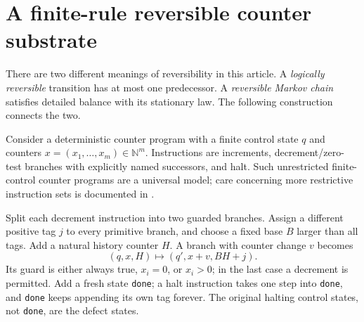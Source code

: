 \documentclass[11pt,letterpaper]{article}
\numberwithin{equation}{section}
\theoremstyle{definition}
\theoremstyle{remark}
\newcommand{\N}{\mathbb N}
\newcommand{\code}[1]{\nolinkurl{#1}}
\newcommand{\srcmark}[1]{\par\noindent{\small\itshape [source~#1]}\par}
\begin{document}
\section{A finite-rule reversible counter substrate}
\label{pqc:rv:sec:counter}
\srcmark{17}
There are two different meanings of reversibility in this article.
A \emph{logically reversible} transition has at most one predecessor.
A \emph{reversible Markov chain} satisfies detailed balance with its
stationary law. The following construction connects the two.

Consider a deterministic counter program with a finite control state
$q$ and counters $x=(x_1,\ldots,x_m)\in\N^m$. Instructions are
increments, decrement/zero-test branches with explicitly named
successors, and halt. Such unrestricted finite-control counter
programs are a universal model; care concerning more restrictive
instruction sets is documented in \cite{b62s17-dudenhefner}.

Split each decrement instruction into two guarded branches. Assign a
different positive tag $j$ to every primitive branch, and choose a
fixed base $B$ larger than all tags. Add a natural history counter
$H$. A branch with counter change $v$ becomes
\begin{equation}\label{pqc:rv:eq:history-rule}
 (q,x,H)\longmapsto(q',x+v,BH+j).
\end{equation}
Its guard is either always true, $x_i=0$, or $x_i>0$; in the last
case a decrement is permitted. Add a fresh state \code{done}; a halt
instruction takes one step into \code{done}, and \code{done} keeps
appending its own tag forever. The original halting control states,
not \code{done}, are the defect states.
\end{document}
